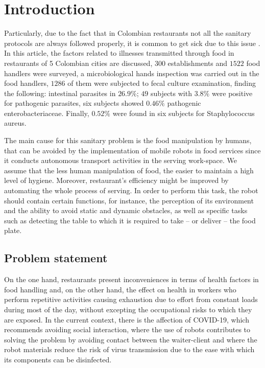\cleardoublepage %
\chapter{Introduction}
Particularly, due to the fact that in Colombian restaurants not all the sanitary protocols are always followed properly, it is common to get sick due to this issue \citep{florez2011factores}. In this article, the factors related to illnesses transmitted through food in restaurants of 5 Colombian cities are discussed, $300$ establishments and $1522$ food handlers were surveyed, a microbiological hands inspection was carried out in the food handlers, $1286$ of them were subjected to fecal culture examination, finding the following: intestinal parasites in $26.9\%$; $49$ subjects with $3.8\%$ were positive for pathogenic parasites, six subjects showed $0.46\%$ pathogenic enterobacteriaceae. Finally, $0.52\%$ were found in six subjects for Staphylococcus aureus. 

The main cause for this sanitary problem is the food manipulation by humans, that can be avoided by the implementation of mobile robots in food services since it conducts autonomous transport activities in the serving work-space. We assume that the less human manipulation of food, the easier to maintain a high level of hygiene. Moreover, restaurant's efficiency might be improved by automating the whole process of serving. In order to perform this task, the robot should contain certain functions, for instance, the perception of its environment and the ability to avoid static and dynamic obstacles, as well as specific tasks such as detecting the table to which it is required to take \--- or deliver \--- the food plate.



\section{Problem statement}

On the one hand, restaurants present inconveniences in terms of health factors in food handling and, on the other hand, the effect on health in workers who perform repetitive activities causing exhaustion due to effort from constant loads during most of the day, without excepting the occupational risks to which they are exposed. In the current context, there is the affection of COVID-19, which recommends avoiding social interaction, where the use of robots contributes to solving the problem by avoiding contact between the waiter-client and where the  robot materials reduce the risk of virus transmission due to the ease with which its components can be disinfected.

